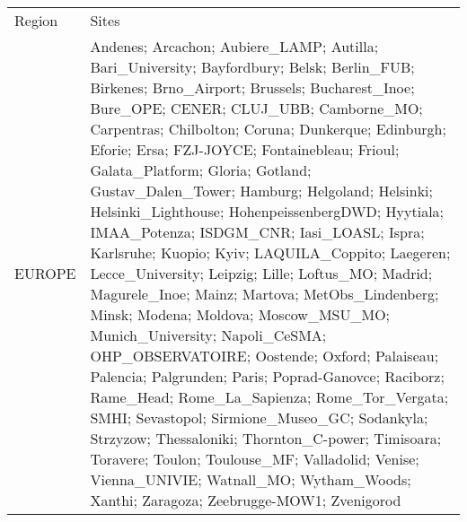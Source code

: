 \begin{table}
 \scriptsize
 \begin{tabularx}{\textwidth}{lX}
  \tophline
  Region    & Sites                                                                                                                                                                                                                                                                                                                                                                                                                                                                                                                                                                                                                                                                                                                                                                                                                                                                                                                                                                                                                                                                                                                                                                                                                                                                                                                                                                                                                                                                                                                                                   \\
  \middlehline
  EUROPE    & Andenes; Arcachon; Aubiere\_LAMP; Autilla; Bari\_University; Bayfordbury; Belsk; Berlin\_FUB; Birkenes; Brno\_Airport; Brussels; Bucharest\_Inoe; Bure\_OPE; CENER; CLUJ\_UBB; Camborne\_MO; Carpentras; Chilbolton; Coruna; Dunkerque; Edinburgh; Eforie; Ersa; FZJ-JOYCE; Fontainebleau; Frioul; Galata\_Platform; Gloria; Gotland; Gustav\_Dalen\_Tower; Hamburg; Helgoland; Helsinki; Helsinki\_Lighthouse; HohenpeissenbergDWD; Hyytiala; IMAA\_Potenza; ISDGM\_CNR; Iasi\_LOASL; Ispra; Karlsruhe; Kuopio; Kyiv; LAQUILA\_Coppito; Laegeren; Lecce\_University; Leipzig; Lille; Loftus\_MO; Madrid; Magurele\_Inoe; Mainz; Martova; MetObs\_Lindenberg; Minsk; Modena; Moldova; Moscow\_MSU\_MO; Munich\_University; Napoli\_CeSMA; OHP\_OBSERVATOIRE; Oostende; Oxford; Palaiseau; Palencia; Palgrunden; Paris; Poprad-Ganovce; Raciborz; Rame\_Head; Rome\_La\_Sapienza; Rome\_Tor\_Vergata; SMHI; Sevastopol; Sirmione\_Museo\_GC; Sodankyla; Strzyzow; Thessaloniki; Thornton\_C-power; Timisoara; Toravere; Toulon; Toulouse\_MF; Valladolid; Venise; Vienna\_UNIVIE; Watnall\_MO; Wytham\_Woods; Xanthi; Zaragoza; Zeebrugge-MOW1; Zvenigorod                                                                                                                                                                                                                                                                                                                                                                                               \\

\end{tabularx}
\end{table}
